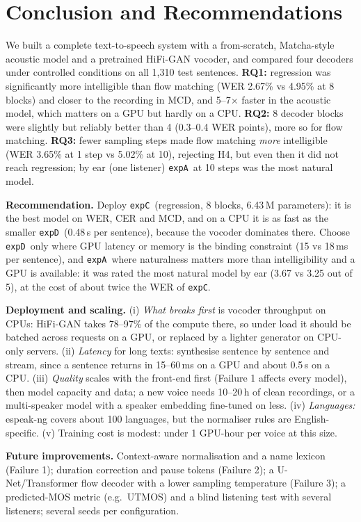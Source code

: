 \documentclass[11pt,a4paper]{article}
\newcommand{\expA}{\texttt{expA}}
\newcommand{\expC}{\texttt{expC}}
\newcommand{\expD}{\texttt{expD}}
\begin{document}
\section{Conclusion and Recommendations}
We built a complete text-to-speech system with a from-scratch, Matcha-style acoustic model and a pretrained HiFi-GAN vocoder, and compared four decoders under controlled conditions on all 1{,}310 test sentences. \textbf{RQ1:} regression was significantly more intelligible than flow matching (WER 2.67\% vs 4.95\% at 8 blocks) and closer to the recording in MCD, and 5--7$\times$ faster in the acoustic model, which matters on a GPU but hardly on a CPU. \textbf{RQ2:} 8 decoder blocks were slightly but reliably better than 4 (0.3--0.4 WER points), more so for flow matching. \textbf{RQ3:} fewer sampling steps made flow matching \emph{more} intelligible (WER 3.65\% at 1 step vs 5.02\% at 10), rejecting H4, but even then it did not reach regression; by ear (one listener) \expA\ at 10 steps was the most natural model.

\noindent\textbf{Recommendation.} Deploy \expC\ (regression, 8 blocks, 6.43\,M parameters): it is the best model on WER, CER and MCD, and on a CPU it is as fast as the smaller \expD\ (0.48\,s per sentence), because the vocoder dominates there. Choose \expD\ only where GPU latency or memory is the binding constraint (15 vs 18\,ms per sentence), and \expA\ where naturalness matters more than intelligibility and a GPU is available: it was rated the most natural model by ear (3.67 vs 3.25 out of 5), at the cost of about twice the WER of \expC.

\noindent\textbf{Deployment and scaling.} (i) \emph{What breaks first} is vocoder throughput on CPUs: HiFi-GAN takes 78--97\% of the compute there, so under load it should be batched across requests on a GPU, or replaced by a lighter generator on CPU-only servers. (ii) \emph{Latency} for long texts: synthesise sentence by sentence and stream, since a sentence returns in 15--60\,ms on a GPU and about 0.5\,s on a CPU. (iii) \emph{Quality} scales with the front-end first (Failure 1 affects every model), then model capacity and data; a new voice needs 10--20\,h of clean recordings, or a multi-speaker model with a speaker embedding fine-tuned on less. (iv) \emph{Languages:} espeak-ng covers about 100 languages, but the normaliser rules are English-specific. (v) Training cost is modest: under 1 GPU-hour per voice at this size.

\noindent\textbf{Future improvements.} Context-aware normalisation and a name lexicon (Failure 1); duration correction and pause tokens (Failure 2); a U-Net/Transformer flow decoder with a lower sampling temperature (Failure 3); a predicted-MOS metric (e.g.\ UTMOS) and a blind listening test with several listeners; several seeds per configuration.
\end{document}
